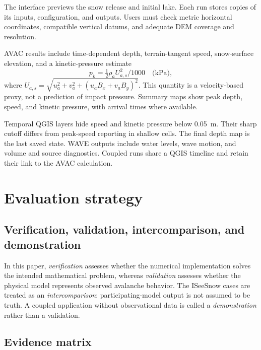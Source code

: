 \documentclass[11pt,a4paper]{article}
\begin{document}
The interface previews the snow release and initial lake. Each run stores
copies of its inputs, configuration, and outputs. Users must check metric
horizontal coordinates, compatible vertical datums, and adequate DEM
coverage and resolution.

AVAC results include time-dependent depth, terrain-tangent speed, snow-surface
elevation, and a kinetic-pressure estimate
\begin{equation}
  p_k=\tfrac12\rho_a U_{a,s}^2/1000\quad\text{(kPa)},
  \label{eq:qgis-kinetic-pressure}
\end{equation}
where $U_{a,s}=\sqrt{u_a^2+v_a^2+(u_aB_x+v_aB_y)^2}$.
This quantity is a velocity-based proxy, not a prediction of impact pressure.
Summary maps show peak depth, speed, and kinetic pressure, with arrival times
where available.

Temporal QGIS layers hide speed and kinetic pressure below
\SI{0.05}{\metre}. Their sharp cutoff differs from peak-speed reporting in
shallow cells. The final depth map is the last saved state. WAVE outputs
include water levels, wave motion, and volume and source diagnostics. Coupled
runs share a QGIS timeline and retain their link to the AVAC calculation.






\newpage
\section{Evaluation strategy}
\label{sec:evaluation-strategy}

\subsection{Verification, validation, intercomparison, and demonstration}

In this paper, \emph{verification} assesses whether the numerical
implementation solves the intended mathematical problem, whereas
\emph{validation} assesses whether the physical model represents observed
avalanche behavior.  The ISeeSnow cases are treated as an
\emph{intercomparison}: participating-model output is not assumed to be truth.
A coupled application without observational data is called a
\emph{demonstration} rather than a validation.


\subsection{Evidence matrix}
\end{document}
